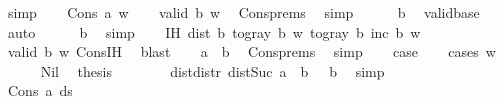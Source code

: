 \begin{isabellebody}
\ simp\isanewline
{}\isamarkupfalse%
\isanewline
\ \ \isamarkupfalse%
\ {\isacharparenleft}{\kern0pt}Cons\ a\ w{\isacharparenright}{\kern0pt}\isanewline
\ \ \isamarkupfalse%
\ {\isachardoublequoteopen}valid\ b\ w{\isachardoublequoteclose}\ \isamarkupfalse%
\ Cons{\isachardot}{\kern0pt}prems\ \isamarkupfalse%
\ simp\isanewline
\ \ \isamarkupfalse%
\ {\isachardoublequoteopen}{}\ {\isasymle}\ b{\isachardoublequoteclose}\ \isamarkupfalse%
\ valid{\isacharunderscore}{\kern0pt}base\ \isamarkupfalse%
\ auto\isanewline
\ \ \isamarkupfalse%
\ {\isachardoublequoteopen}{}\ {\isacharless}{\kern0pt}\ b{\isachardoublequoteclose}\ \isamarkupfalse%
\ simp\isanewline
\ \ \isamarkupfalse%
\ IH{\isacharcolon}{\kern0pt}\ {\isachardoublequoteopen}dist\ b\ {\isacharparenleft}{\kern0pt}to{\isacharunderscore}{\kern0pt}gray\ b\ w{\isacharparenright}{\kern0pt}\ {\isacharparenleft}{\kern0pt}to{\isacharunderscore}{\kern0pt}gray\ b\ {\isacharparenleft}{\kern0pt}inc\ b\ w{\isacharparenright}{\kern0pt}{\isacharparenright}{\kern0pt}\ {\isasymle}\ {}{\isachardoublequoteclose}\isanewline
\ \ \ \ \isamarkupfalse%
\ {\isacartoucheopen}valid\ b\ w{\isacartoucheclose}\ Cons{\isachardot}{\kern0pt}IH\ \isamarkupfalse%
\ blast\isanewline
\ \ \isamarkupfalse%
\ {\isachardoublequoteopen}a\ {\isacharless}{\kern0pt}\ b{\isachardoublequoteclose}\ \isamarkupfalse%
\ Cons{\isachardot}{\kern0pt}prems\ \isamarkupfalse%
\ simp\isanewline
\ \ \isamarkupfalse%
\ {\isacharquery}{\kern0pt}case\isanewline
\ \ \isamarkupfalse%
\ {\isacharparenleft}{\kern0pt}cases\ w{\isacharparenright}{\kern0pt}\isanewline
\ \ \ \ \isamarkupfalse%
\ Nil\ \isamarkupfalse%
\ {\isacharquery}{\kern0pt}thesis\isanewline
\ \ \ \ \ \ \isamarkupfalse%
\ dist{}{\isacharunderscore}{\kern0pt}distr\ dist{}{\isacharunderscore}{\kern0pt}Suc\ {\isacartoucheopen}a\ {\isacharless}{\kern0pt}\ b{\isacartoucheclose}\ {\isacartoucheopen}{}\ {\isasymle}\ b{\isacartoucheclose}\ \isamarkupfalse%
\ simp\isanewline
\ \ \isamarkupfalse%
\isanewline
\ \ \ \ \isamarkupfalse%
\ {\isacharparenleft}{\kern0pt}Cons\ a{\isacharprime}{\kern0pt}\ ds{\isacharprime}{\kern0pt}{\isacharparenright}{\kern0pt}\isanewline

\end{isabellebody}

